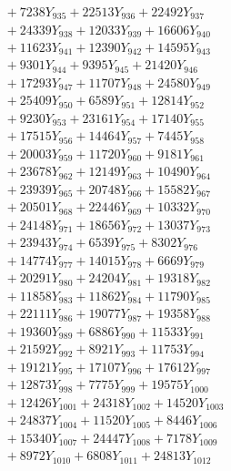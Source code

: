 \documentclass[a4paper,10pt]{article}
\begin{document}
{\begin{align}
&\;  + 7238 Y_{935} + 22513 Y_{936} + 22492 Y_{937} \\[0.3ex]
&\;  + 24339 Y_{938} + 12033 Y_{939} + 16606 Y_{940} \\[0.3ex]
&\;  + 11623 Y_{941} + 12390 Y_{942} + 14595 Y_{943} \\[0.3ex]
&\;  + 9301 Y_{944} + 9395 Y_{945} + 21420 Y_{946} \\[0.3ex]
&\;  + 17293 Y_{947} + 11707 Y_{948} + 24580 Y_{949} \\[0.3ex]
&\;  + 25409 Y_{950} + 6589 Y_{951} + 12814 Y_{952} \\[0.3ex]
&\;  + 9230 Y_{953} + 23161 Y_{954} + 17140 Y_{955} \\[0.3ex]
&\;  + 17515 Y_{956} + 14464 Y_{957} + 7445 Y_{958} \\[0.5ex]\allowbreak
&\;  + 20003 Y_{959} + 11720 Y_{960} + 9181 Y_{961} \\[0.3ex]
&\;  + 23678 Y_{962} + 12149 Y_{963} + 10490 Y_{964} \\[0.3ex]
&\;  + 23939 Y_{965} + 20748 Y_{966} + 15582 Y_{967} \\[0.3ex]
&\;  + 20501 Y_{968} + 22446 Y_{969} + 10332 Y_{970} \\[0.3ex]
&\;  + 24148 Y_{971} + 18656 Y_{972} + 13037 Y_{973} \\[0.3ex]
&\;  + 23943 Y_{974} + 6539 Y_{975} + 8302 Y_{976} \\[0.3ex]
&\;  + 14774 Y_{977} + 14015 Y_{978} + 6669 Y_{979} \\[0.3ex]
&\;  + 20291 Y_{980} + 24204 Y_{981} + 19318 Y_{982} \\[0.3ex]
&\;  + 11858 Y_{983} + 11862 Y_{984} + 11790 Y_{985} \\[0.3ex]
&\;  + 22111 Y_{986} + 19077 Y_{987} + 19358 Y_{988} \\[0.5ex]\allowbreak
&\;  + 19360 Y_{989} + 6886 Y_{990} + 11533 Y_{991} \\[0.3ex]
&\;  + 21592 Y_{992} + 8921 Y_{993} + 11753 Y_{994} \\[0.3ex]
&\;  + 19121 Y_{995} + 17107 Y_{996} + 17612 Y_{997} \\[0.3ex]
&\;  + 12873 Y_{998} + 7775 Y_{999} + 19575 Y_{1000} \\[0.3ex]
&\;  + 12426 Y_{1001} + 24318 Y_{1002} + 14520 Y_{1003} \\[0.3ex]
&\;  + 24837 Y_{1004} + 11520 Y_{1005} + 8446 Y_{1006} \\[0.3ex]
&\;  + 15340 Y_{1007} + 24447 Y_{1008} + 7178 Y_{1009} \\[0.3ex]
&\;  + 8972 Y_{1010} + 6808 Y_{1011} + 24813 Y_{1012} \\[0.3ex]

\end{align}}
\end{document}
